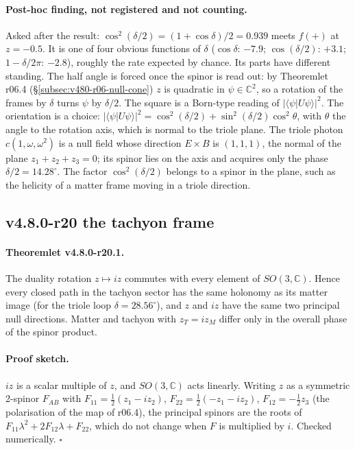 \paragraph{Post-hoc finding, not registered and not counting.}
Asked after the result: \(\cos^2(\delta/2)=(1+\cos\delta)/2=0.939\) meets \(f(+)\) at \(z=-0.5\).  It is one of four
obvious functions of \(\delta\) (\(\cos\delta\): \(-7.9\); \(\cos(\delta/2)\): \(+3.1\); \(1-\delta/2\pi\): \(-2.8\)), roughly
the rate expected by chance.  Its parts have different standing.  The half angle is forced once the spinor is read
out: by Theoremlet r06.4 (\S\ref{subsec:v480-r06-null-cone}) \(z\) is quadratic in \(\psi\in\mathbb C^2\), so a rotation
of the frames by \(\delta\) turns \(\psi\) by \(\delta/2\).  The square is a Born-type reading of \(|\langle\psi|U\psi\rangle|^2\).
The orientation is a choice: \(|\langle\psi|U\psi\rangle|^2=\cos^2(\delta/2)+\sin^2(\delta/2)\cos^2\theta\), with \(\theta\) the
angle to the rotation axis, which is normal to the triole plane.  The triole photon \(c(1,\omega,\omega^2)\) is a null
field whose direction \(E\times B\) is \((1,1,1)\), the normal of the plane \(z_1+z_2+z_3=0\); its spinor lies on the
axis and acquires only the phase \(\delta/2=14.28^\circ\).  The factor \(\cos^2(\delta/2)\) belongs to a spinor in the plane,
such as the helicity of a matter frame moving in a triole direction.

\subsection*{v4.8.0-r20 the tachyon frame}
\label{subsec:v480-r20-tachyon}

\paragraph{Theoremlet v4.8.0-r20.1.}
The duality rotation \(z\mapsto iz\) commutes with every element of \(SO(3,\mathbb C)\).  Hence every closed path in
the tachyon sector has the same holonomy as its matter image (for the triole loop \(\delta=28.56^\circ\)), and \(z\) and
\(iz\) have the same two principal null directions.  Matter and tachyon with \(z_T=iz_M\) differ only in the overall
phase of the spinor product.

\paragraph{Proof sketch.}
\(iz\) is a scalar multiple of \(z\), and \(SO(3,\mathbb C)\) acts linearly.  Writing \(z\) as a symmetric 2-spinor
\(F_{AB}\) with \(F_{11}=\tfrac12(z_1-iz_2)\), \(F_{22}=\tfrac12(-z_1-iz_2)\), \(F_{12}=-\tfrac12z_3\) (the polarisation of the
map of r06.4), the principal spinors are the roots of \(F_{11}\lambda^2+2F_{12}\lambda+F_{22}\), which do not change when
\(F\) is multiplied by \(i\).  Checked numerically.  \(\square\)

